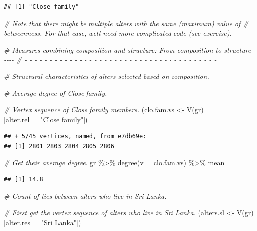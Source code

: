 \documentclass[
]{book}
\newenvironment{Shaded}{\begin{snugshade}}{\end{snugshade}}
\newcommand{\AttributeTok}[1]{\textcolor[rgb]{0.77,0.63,0.00}{#1}}
\newcommand{\CommentTok}[1]{\textcolor[rgb]{0.56,0.35,0.01}{\textit{#1}}}
\newcommand{\FunctionTok}[1]{\textcolor[rgb]{0.00,0.00,0.00}{#1}}
\newcommand{\NormalTok}[1]{#1}
\newcommand{\OtherTok}[1]{\textcolor[rgb]{0.56,0.35,0.01}{#1}}
\newcommand{\SpecialCharTok}[1]{\textcolor[rgb]{0.00,0.00,0.00}{#1}}
\newcommand{\StringTok}[1]{\textcolor[rgb]{0.31,0.60,0.02}{#1}}
\begin{document}
\begin{verbatim}
## [1] "Close family"
\end{verbatim}

\begin{Shaded}
\begin{Highlighting}[]
\CommentTok{\# Note that there might be multiple alters with the same (maximum) value of }
\CommentTok{\# betweenness. For that case, we\textquotesingle{}ll need more complicated code (see exercise).}

\CommentTok{\# Measures combining composition and structure: From composition to structure {-}{-}{-}{-}}
\CommentTok{\# {-} {-} {-} {-} {-} {-} {-} {-} {-} {-} {-} {-} {-} {-} {-} {-} {-} {-} {-} {-} {-} {-} {-} {-} {-} {-} {-} {-} {-} {-} {-} {-} {-} {-} {-} {-} {-} {-} {-} }

\CommentTok{\# Structural characteristics of alters selected based on composition.}

\CommentTok{\# Average degree of Close family.}

\CommentTok{\# Vertex sequence of Close family members.}
\NormalTok{(clo.fam.vs }\OtherTok{\textless{}{-}} \FunctionTok{V}\NormalTok{(gr)[alter.rel}\SpecialCharTok{==}\StringTok{"Close family"}\NormalTok{])}
\end{Highlighting}
\end{Shaded}

\begin{verbatim}
## + 5/45 vertices, named, from e7db69e:
## [1] 2801 2803 2804 2805 2806
\end{verbatim}

\begin{Shaded}
\begin{Highlighting}[]
\CommentTok{\# Get their average degree.}
\NormalTok{gr }\SpecialCharTok{\%\textgreater{}\%}
  \FunctionTok{degree}\NormalTok{(}\AttributeTok{v =}\NormalTok{ clo.fam.vs) }\SpecialCharTok{\%\textgreater{}\%} 
\NormalTok{  mean}
\end{Highlighting}
\end{Shaded}

\begin{verbatim}
## [1] 14.8
\end{verbatim}

\begin{Shaded}
\begin{Highlighting}[]
\CommentTok{\# Count of ties between alters who live in Sri Lanka.}

\CommentTok{\# First get the vertex sequence of alters who live in Sri Lanka.}
\NormalTok{(alters.sl }\OtherTok{\textless{}{-}} \FunctionTok{V}\NormalTok{(gr)[alter.res}\SpecialCharTok{==}\StringTok{"Sri Lanka"}\NormalTok{])}
\end{Highlighting}
\end{Shaded}
\end{document}
